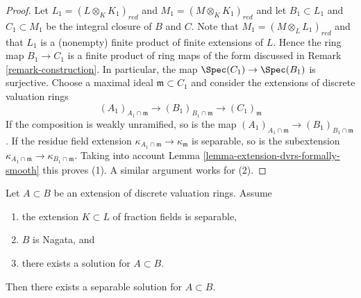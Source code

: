 \begin{proof}
Let $L_1 = (L \otimes_K K_1)_{red}$ and $M_1 = (M \otimes_K K_1)_{red}$
and let $B_1 \subset L_1$ and $C_1 \subset M_1$ be the integral closure
of $B$ and $C$. Note that $M_1 = (M \otimes_L L_1)_{red}$ and that $L_1$
is a (nonempty) finite product of finite extensions of $L$. Hence the
ring map $B_1 \to C_1$ is a finite product of ring maps of the form discussed
in Remark \ref{remark-construction}. In particular, the map
$\Spec(C_1) \to \Spec(B_1)$ is surjective. Choose a maximal ideal
$\mathfrak m \subset C_1$ and consider the extensions of discrete
valuation rings
$$
(A_1)_{A_1 \cap \mathfrak m} \to
(B_1)_{B_1 \cap \mathfrak m} \to
(C_1)_\mathfrak m
$$
If the composition is weakly unramified, so is the map
$(A_1)_{A_1 \cap \mathfrak m} \to (B_1)_{B_1 \cap \mathfrak m}$.
If the residue field extension
$\kappa_{A_1 \cap \mathfrak m} \to \kappa_\mathfrak m$ is separable,
so is the subextension
$\kappa_{A_1 \cap \mathfrak m} \to \kappa_{B_1 \cap \mathfrak m}$.
Taking into account Lemma \ref{lemma-extension-dvrs-formally-smooth}
this proves (1). A similar argument works for (2).
\end{proof}

\begin{lemma}
\label{lemma-separable-solution-separable-solution}
Let $A \subset B$ be an extension of discrete valuation rings.
Assume
\begin{enumerate}
\item the extension $K \subset L$ of fraction fields is separable,
\item $B$ is Nagata, and
\item there exists a solution for $A \subset B$.
\end{enumerate}
Then there exists a separable solution for $A \subset B$.
\end{lemma}

